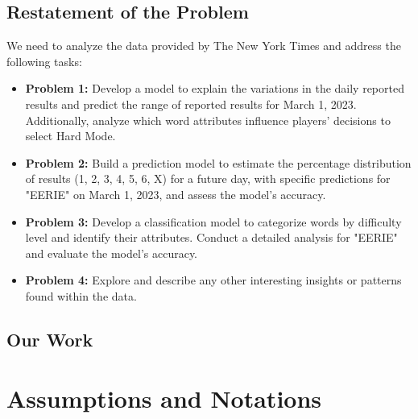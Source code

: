 \documentclass{mcmthesis}  %
\begin{document}
\subsection{Restatement of the Problem}

We need to analyze the data provided by The New York Times and address the following tasks:
\begin{itemize}  %
        \item \textbf{Problem 1: }Develop a model to explain the variations in the daily reported results and predict the 
        range of reported results for March 1, 2023. Additionally, analyze which word attributes influence 
        players' decisions to select Hard Mode.
        \item \textbf{Problem 2: }Build a prediction model to estimate the percentage distribution of results (1, 2, 3, 4, 5, 6, X) 
        for a future day, with specific predictions for "EERIE" on March 1, 2023, and assess the model's accuracy.
        \item \textbf{Problem 3: }Develop a classification model to categorize words by difficulty level and identify their attributes. 
        Conduct a detailed analysis for "EERIE" and evaluate the model's accuracy.
        \item \textbf{Problem 4: }Explore and describe any other interesting insights or patterns found within the data.
\end{itemize}  %

\subsection{Our Work}

\section{Assumptions and Notations}  %
\end{document}

